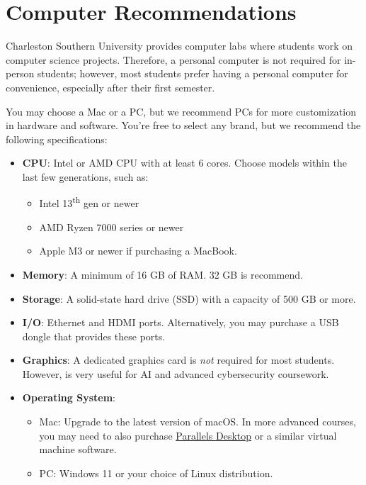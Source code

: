 \section{Computer Recommendations}
Charleston Southern University provides computer labs where students work on computer science projects. Therefore, a personal computer is not required for in-person students; however, most students prefer having a personal computer for convenience, especially after their first semester.

\vspace{1em}
You may choose a Mac or a PC, but we recommend PCs for more customization in hardware and software. You're free to select any brand, but we recommend the following specifications:

\begin{itemize}
    \item
        \textbf{CPU}: Intel or AMD CPU with at least 6 cores. Choose models within the last few generations, such as:
        \begin{itemize}
            \item Intel 13\textsuperscript{th} gen or newer
            \item AMD Ryzen 7000 series or newer
            \item Apple M3 or newer if purchasing a MacBook.
        \end{itemize}
    \item
        \textbf{Memory}: A minimum of 16 GB of RAM\@. 32 GB is recommend.
    \item
        \textbf{Storage}: A solid-state hard drive (SSD) with a capacity of 500 GB or more.
    \item
        \textbf{I/O}: Ethernet and HDMI ports. Alternatively, you may purchase a USB dongle that provides these ports.
    \item
        \textbf{Graphics}: A dedicated graphics card is \emph{not} required for most students. However, is very useful for AI and advanced cybersecurity coursework.
    \item
        \textbf{Operating System}:
        \begin{itemize}
            \item {Mac}: Upgrade to the latest version of macOS\@. In more advanced courses, you may need to also purchase \href{https://www.parallels.com/products/desktop/}{Parallels Desktop} or a similar virtual machine software.
            \item {PC}: Windows 11 or your choice of Linux distribution.
        \end{itemize}
\end{itemize}